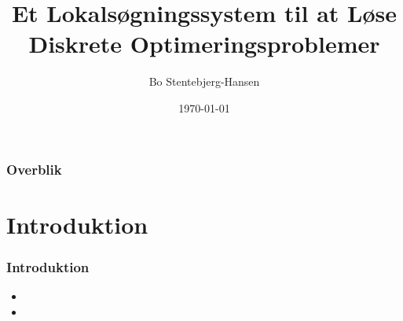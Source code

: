 \documentclass[12pt]{beamer}
\title[]{Et Lokalsøgningssystem til at Løse Diskrete 
Optimeringsproblemer}%
\author{Bo Stentebjerg-Hansen} %
\institute[IMADA] %
{
Syddansk Universitet \\ %
\medskip
Institut for Matematik og Datalogi
}
\date{\today} %
\begin{document}
\begin{frame}
\titlepage %
\end{frame}

\begin{frame}
\frametitle{Overblik} %
\tableofcontents %
\end{frame}


\section{Introduktion} %

\begin{frame}
\frametitle{Introduktion}
\begin{itemize}[<+->]
\item 
\item 
\end{itemize}




\end{frame}
\end{document}
